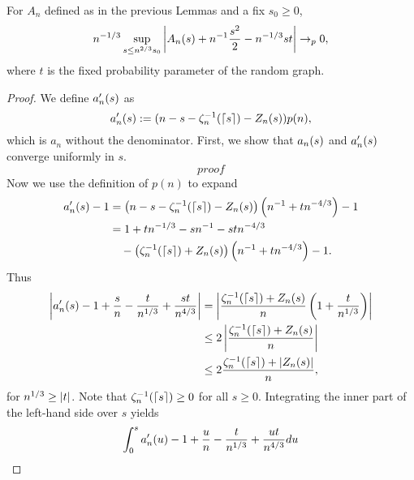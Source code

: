 \begin{lemma} \label{L: asymptotic An}
	For $A_n$ defined as in the previous Lemmas and a fix $s_0 \geq 0$,
	\begin{equation} \label{E: asymptotic An}
	n^{-1 / 3} \sup_{s \leq n^{2 / 3} s_0 } \left| A_n(s) + n^{-1}\frac{s^2}{2} - n^{-1 / 3}st \right| \rightarrow_p 0,
	\end{equation}
	where $t$ is the fixed probability parameter of the random graph.
\end{lemma}
\begin{proof} \label{P: asymptotic An}
	We define $a'_n(s)$ as
	\begin{equation}
		a'_n(s) := (n - s - \zeta^{-1}_n(\lceil s\rceil) - Z_n(s)) p(n),
	\end{equation}
	which is $a_n$ without the denominator.
	First, we show that $a_n(s)$ and $a'_n(s)$ converge uniformly in $s$.
	\begin{equation}
	proof
	\end{equation}
	Now we use the definition of $p(n)$ to expand
	\begin{align*}
	a'_n(s) - 1 
	&= \left( n - s - \zeta^{-1}_n(\lceil s\rceil) - Z_n(s) \right) \left( n^{-1} + tn^{-4 / 3} \right) - 1 \\
	&= 1 + tn^{-1 / 3} - sn^{-1} - stn^{-4 / 3} \\
	&\quad - \left( \zeta^{-1}_n(\lceil s\rceil) + Z_n(s) \right) \left( n^{-1} + tn^{-4 / 3} \right) -1 .
	\end{align*}
	Thus
	\begin{equation} \label{E: (27)} 
	\begin{aligned}
	\left| a'_n(s) - 1 + \frac{s}{n} - \frac{t}{n^{1 / 3}} + \frac{st}{n^{4 / 3}} \right|
	&= \left| \frac{\zeta^{-1}_n(\lceil s\rceil) + Z_n(s)}{n} \left( 1 + \frac{t}{n^{1 / 3}} \right) \right| \\
	&\leq 2 \left| \frac{\zeta^{-1}_n(\lceil s\rceil) + Z_n(s)}{n} \right| \\
	&\leq 2 \frac{\zeta^{-1}_n(\lceil s\rceil) + |Z_n(s)|}{n} ,  
	\end{aligned}
	\end{equation}
	for $n^{1 / 3} \geq |t|$. Note that $\zeta^{-1}_n(\lceil s\rceil) \geq 0$ for all $s \geq 0$.
	Integrating the inner part of the left-hand side over $s$ yields
	\begin{align*}
	\int_{0}^{s} \amn{u} - 1 + \frac{u}{n} - \frac{t}{\n{1}{3}} + \frac{ut}{\n{4}{3}} du

\end{align*}
\end{proof}
